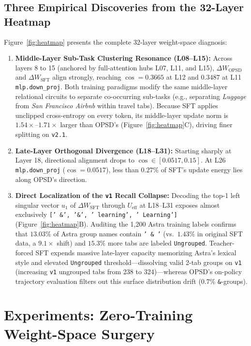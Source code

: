 \documentclass[11pt,a4paper]{article}
\begin{document}
\subsection{Three Empirical Discoveries from the 32-Layer Heatmap}
Figure~\ref{fig:heatmap} presents the complete 32-layer weight-space diagnosis:
\begin{enumerate}
    \item \textbf{Middle-Layer Sub-Task Clustering Resonance (L08--L15):} Across layers 8 to 15 (anchored by full-attention hubs L07, L11, and L15), $\Delta W_{\text{OPSD}}$ and $\Delta W_{\text{SFT}}$ align strongly, reaching $\cos = 0.3665$ at L12 and $0.3487$ at L11 \texttt{mlp.down\_proj}. Both training paradigms modify the same middle-layer relational circuits to separate co-occurring sub-tasks (e.g., separating \emph{Luggage} from \emph{San Francisco Airbnb} within travel tabs). Because SFT applies unclipped cross-entropy on every token, its middle-layer update norm is $1.54\times$--$1.71\times$ larger than OPSD's (Figure~\ref{fig:heatmap}C), driving finer splitting on \texttt{v2.1}.
    \item \textbf{Late-Layer Orthogonal Divergence (L18--L31):} Starting sharply at Layer 18, directional alignment drops to $\cos \in [0.0517, 0.15]$. At L26 \texttt{mlp.down\_proj} ($\cos = 0.0517$), less than $0.27\%$ of SFT's update energy lies along OPSD's direction.
    \item \textbf{Direct Localization of the \texttt{v1} Recall Collapse:} Decoding the top-1 left singular vector $u_1$ of $\Delta W_{\text{SFT}}$ through $U_{\text{eff}}$ at L18--L31 exposes almost exclusively \texttt{[' \&', '\&', ' learning', ' Learning']} (Figure~\ref{fig:heatmap}B). Auditing the 1,200 Astra training labels confirms that $13.03\%$ of Astra group names contain \texttt{' \& '} (vs.\ $1.43\%$ in original SFT data, a $9.1\times$ shift) and $15.3\%$ more tabs are labeled \texttt{Ungrouped}. Teacher-forced SFT expends massive late-layer capacity memorizing Astra's lexical style and elevated \texttt{Ungrouped} threshold—dissolving valid 2-tab groups on \texttt{v1} (increasing \texttt{v1} ungrouped tabs from 238 to 324)—whereas OPSD's on-policy trajectory evaluation filters out this surface distribution drift ($0.7\%$ \texttt{\&}-groups).
\end{enumerate}

\section{Experiments: Zero-Training Weight-Space Surgery}
\end{document}

